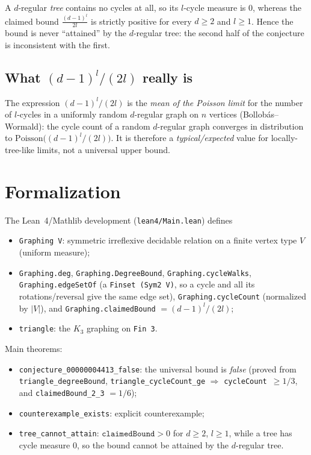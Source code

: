 \documentclass[11pt]{article}
\begin{document}
A $d$-regular \emph{tree} contains no cycles at all, so its $l$-cycle
measure is $0$, whereas the claimed bound $\frac{(d-1)^l}{2l}$ is strictly
positive for every $d \ge 2$ and $l \ge 1$.  Hence the bound is never
``attained'' by the $d$-regular tree: the second half of the conjecture is
inconsistent with the first.

\subsection{What $(d-1)^l/(2l)$ really is}

The expression $(d-1)^l/(2l)$ is the \emph{mean of the Poisson limit} for
the number of $l$-cycles in a uniformly random $d$-regular graph on $n$
vertices (Bollob\'as--Wormald): the cycle count of a random $d$-regular
graph converges in distribution to $\mathrm{Poisson}\bigl((d-1)^l/(2l)\bigr)$.
It is therefore a \emph{typical/expected} value for locally-tree-like limits,
not a universal upper bound.

\section{Formalization}

The Lean~4/Mathlib development (\texttt{lean4/Main.lean}) defines

\begin{itemize}
  \item \texttt{Graphing V}: symmetric irreflexive decidable relation on a
        finite vertex type $V$ (uniform measure);
  \item \texttt{Graphing.deg}, \texttt{Graphing.DegreeBound},
        \texttt{Graphing.cycleWalks}, \texttt{Graphing.edgeSetOf}
        (a \texttt{Finset (Sym2 V)}, so a cycle and all its
        rotations/reversal give the same edge set),
        \texttt{Graphing.cycleCount} (normalized by $|V|$), and
        \texttt{Graphing.claimedBound} $= (d-1)^l/(2l)$;
  \item \texttt{triangle}: the $K_3$ graphing on \texttt{Fin 3}.
\end{itemize}

\noindent Main theorems:

\begin{itemize}
  \item \texttt{conjecture\_00000004413\_false}: the universal bound is
        \emph{false} (proved from
        \texttt{triangle\_degreeBound}, \texttt{triangle\_cycleCount\_ge}
        $\Rightarrow$ \texttt{cycleCount}~$\ge 1/3$, and
        \texttt{claimedBound\_2\_3} $= 1/6$);
  \item \texttt{counterexample\_exists}: explicit counterexample;
  \item \texttt{tree\_cannot\_attain}: $\texttt{claimedBound} > 0$ for
        $d \ge 2$, $l \ge 1$, while a tree has cycle measure $0$, so the
        bound cannot be attained by the $d$-regular tree.
\end{itemize}
\end{document}
